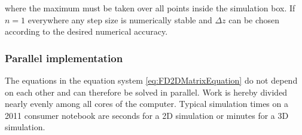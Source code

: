 where the maximum must be taken over all points inside the simulation box. If $n = 1$ everywhere any step size is numerically stable and $\Delta z$ can be chosen according to the desired numerical accuracy.

\subsubsection{Parallel implementation}

The equations in the equation system \eqref{eq:FD2DMatrixEquation} do not depend on each other and can therefore be solved in parallel. Work is hereby divided nearly evenly among all cores of the computer. Typical simulation times on a 2011 consumer notebook are seconds for a 2D simulation or minutes for a 3D simulation.


